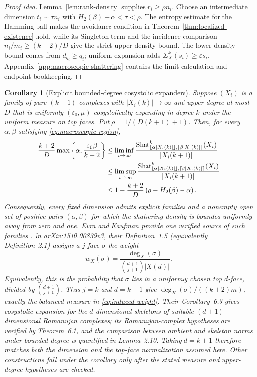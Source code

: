 \documentclass[11pt,letterpaper]{article}
\theoremstyle{plain}
\newtheorem{corollary}[theorem]{Corollary}
\theoremstyle{definition}
\newcommand{\Shat}{\operatorname{Shat}}
\newcommand{\1}{\mathbf{1}}
\newcommand{\abs}[1]{\left|#1\right|}
\newcommand{\ceil}[1]{\left\lceil#1\right\rceil}
\newcommand{\floor}[1]{\left\lfloor#1\right\rfloor}
\begin{document}
\begin{proof}[Proof idea]
Lemma~\ref{lem:rank-density} supplies $r_i\ge\rho n_i$.  Choose an intermediate dimension
$t_i\sim\tau n_i$ with $H_2(\beta)+\alpha<\tau<\rho$.  The entropy estimate for the
Hamming ball makes the avoidance condition in
Theorem~\ref{thm:localized-existence} hold, while its Singleton term and the incidence
comparison $n_i/m_i\ge(k+2)/D$ give the strict upper-density bound.  The lower-density
bound comes from $d_{q_i}\ge q_i$; uniform expansion adds
$\Sigma_X^k(s_i)\ge\varepsilon s_i$.  Appendix~\ref{app:macroscopic-shattering}
contains the limit calculation and endpoint bookkeeping.
\end{proof}

\begin{corollary}[Explicit bounded-degree cosystolic expanders]
\label{cor:explicit-cosystolic}
Suppose $(X_i)$ is a family of pure $(k+1)$-complexes with $|X_i(k)|\to\infty$ and
upper degree at most $D$ that is uniformly $(\varepsilon_0,\mu)$-cosystolically
expanding in degree $k$ under the uniform measure on top faces.  Put
$\rho=1/(D(k+1)+1)$.  Then, for every $\alpha,\beta$ satisfying
\eqref{eq:macroscopic-region},
\begin{align}\label{eq:explicit-density-bounds}
 \frac{k+2}{D}
 \max\left\{\alpha,\frac{\varepsilon_0\beta}{k+2}\right\}
 &\le
 \liminf_{i\to\infty}
 \frac{\Shat_{\floor{\alpha\abs{X_i(k)}},
                   \ceil{\beta\abs{X_i(k)}}}^k(X_i)}{\abs{X_i(k+1)}}
 \notag\\
 &\le
 \limsup_{i\to\infty}
 \frac{\Shat_{\floor{\alpha\abs{X_i(k)}},
                   \ceil{\beta\abs{X_i(k)}}}^k(X_i)}{\abs{X_i(k+1)}}
 \notag\\
 &\le
 1-\frac{k+2}{D}\left(\rho-H_2(\beta)-\alpha\right).
\end{align}
Consequently, every fixed dimension admits explicit families and a nonempty open set of
positive pairs $(\alpha,\beta)$ for which the shattering density is bounded uniformly
away from zero and one.  Evra and Kaufman provide one verified source of such families
\cite{evrakaufman2024}.  In arXiv:1510.00839v3, their Definition~1.5 (equivalently
Definition~2.1) assigns a $j$-face $\sigma$ the weight
\[
 w_X(\sigma)=
 \frac{\deg_X(\sigma)}{\binom{d+1}{j+1}\abs{X(d)}}.
\]
Equivalently, this is the probability that $\sigma$ lies in a uniformly chosen top
$d$-face, divided by $\binom{d+1}{j+1}$.  Thus $j=k$ and $d=k+1$ give
$\deg_X(\sigma)/((k+2)m)$, exactly the balanced measure in
\eqref{eq:induced-weight}.  Their Corollary~6.3 gives cosystolic expansion for the
$d$-dimensional skeletons of suitable $(d+1)$-dimensional Ramanujan complexes; its
Ramanujan-complex hypotheses are verified by Theorem~6.1, and the comparison between
ambient and skeleton norms under bounded degree is quantified in Lemma~2.10.  Taking
$d=k+1$ therefore matches both the dimension and the top-face normalization assumed
here.  Other constructions fall under the corollary only after the stated measure and
upper-degree hypotheses are checked.
\end{corollary}
\end{document}

